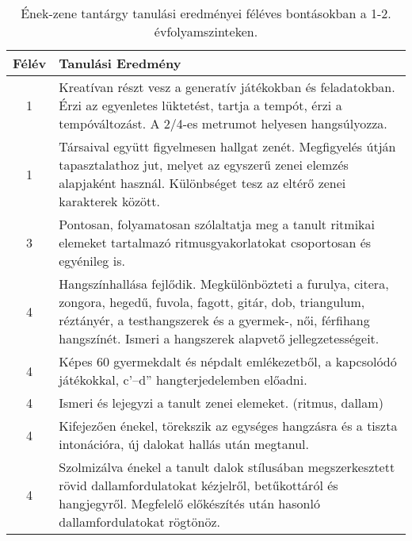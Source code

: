        
           \begin{longtable}{c | p{12cm} }
            \caption[Ének-zene 1-2.]{Ének-zene tantárgy tanulási eredményei féléves bontásokban a 1-2. évfolyamszinteken. }  \\

            \textbf{Félév} & \textbf{Tanulási Eredmény} \\
            \hline
            \endhead
                                
                                          1 &  Kreatívan részt vesz a generatív játékokban és feladatokban. Érzi az egyenletes lüktetést, tartja a tempót, érzi a tempóváltozást. A 2/4-es metrumot helyesen hangsúlyozza. \\ \hline
                                          1 &  Társaival együtt figyelmesen hallgat zenét. Megfigyelés útján tapasztalathoz jut, melyet az egyszerű zenei elemzés alapjaként használ. Különbséget tesz az eltérő zenei karakterek között. \\ \hline
                                      
                                
                                          3 &  Pontosan, folyamatosan szólaltatja meg a tanult ritmikai elemeket tartalmazó ritmusgyakorlatokat csoportosan és egyénileg is. \\ \hline
                                      
                                
                                          4 &  Hangszínhallása fejlődik. Megkülönbözteti a furulya, citera, zongora, hegedű, fuvola, fagott, gitár, dob, triangulum, réztányér, a testhangszerek és a gyermek-, női, férfihang hangszínét. Ismeri a hangszerek alapvető jellegzetességeit. \\ \hline
                                          4 &  Képes 60 gyermekdalt és népdalt emlékezetből, a kapcsolódó játékokkal, c’–d” hangterjedelemben előadni. \\ \hline
                                          4 &  Ismeri és lejegyzi a tanult zenei elemeket. (ritmus, dallam) \\ \hline
                                          4 &  Kifejezően énekel, törekszik az egységes hangzásra és a tiszta intonációra, új dalokat hallás után megtanul. \\ \hline
                                          4 &  Szolmizálva énekel a tanult dalok stílusában megszerkesztett rövid dallamfordulatokat kézjelről, betűkottáról és hangjegyről. Megfelelő előkészítés után hasonló dallamfordulatokat rögtönöz. \\ \hline
                                      
                        \end{longtable}
            \clearpage

